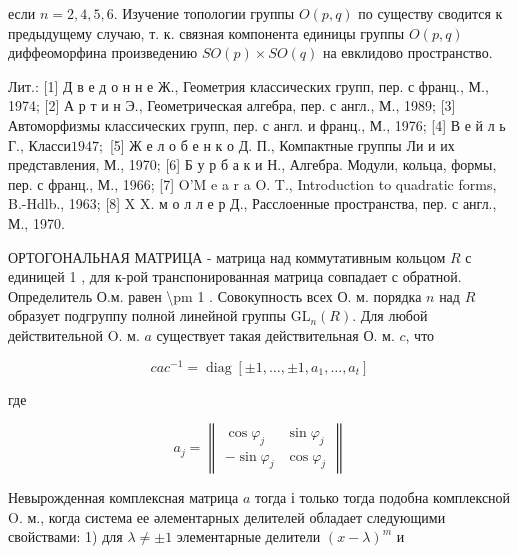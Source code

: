 \documentclass[10pt]{article}
\begin{document}
если $n=2,4,5,6$. Изучение топологии группы $O(p, q)$ по существу сводится к предыдущему случаю, т. к. связная компонента единицы группы $O(p, q)$ диффеоморфина произведению $S O(p) \times S O(q)$ на евклидово пространство.



Лит.: [1] Д в е д о н н е Ж., Геометрия классических групп, пер. с франц., М., 1974; [2] А р т и н Э., Геометрическая алгебра, пер. с англ., М., 1989; [3] Автоморфизмы классических групп, пер. с англ. и франц., М., 1976; [4] В е й л ь Г., Класси$1947 ;$ [5] Ж е л о б е н к о Д. П., Компактные группы Ли и их представления, М., 1970; [6] Б у р б а к и Н., Алгебра. Модули, кольца, формы, пер. с франц., М., 1966; [7] O'M e a r a O. T., Introduction to quadratic forms, B.-Hdlb., 1963; [8] X $\mathrm{X}$. м о л л е р Д., Расслоенные пространства, пер. с англ., М., 1970.



ОРТОГОНАЛЬНАЯ МАТРИЦА - матрица над коммутативным кольцом $R$ с единицей 1 , для к-рой транспонированная матрица совпадает с обратной. Определитель О.м. равен \textbackslash pm 1 . Совокупность всех $О$. м. порядка $n$ над $R$ образует подгруппу полной линейной группы $\mathrm{GL}_{n}(R)$. Для любой действительной $\mathrm{O}$. м. $a$ существует такая действительная О. м. $c$, что



\[

c a c^{-1}=\operatorname{diag}\left[ \pm 1, \ldots, \pm 1, a_{1}, \ldots, a_{t}\right]

\]



где



\[

a_{j}=\left\|\begin{array}{rr}

\cos \varphi_{j} & \sin \varphi_{j} \\

-\sin \varphi_{j} & \cos \varphi_{j}

\end{array}\right\|

\]



Невырожденная комплексная матрица $a$ тогда і только тогда подобна комплексной $\mathrm{O}$. м., когда система ее әлементарных делителей обладает следующими свойствами: 1) для $\lambda \neq \pm 1$ элементарные делители $(x-\lambda)^{m}$ и
\end{document}
